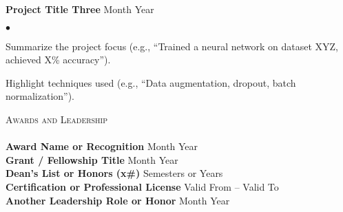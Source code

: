 \documentclass[10.5pt]{article}
\newcommand{\lineunder}{\vspace*{-8pt} \\ \hspace*{-18pt} \hrulefill \\}
\newcommand{\header}[1]{{\hspace*{-15pt}\vspace*{6pt} \textsc{#1}} \vspace*{-6pt} \lineunder}
\newcommand{\award}[2]{{\textbf{#1} \hfill #2}}
\newcommand{\project}[2]{{\textbf{#1} \hfill #2}}
\newenvironment{achievements}
  {\begin{list}{$\bullet$}{\topsep 0pt \itemsep -2pt}}  
  {\end{list}}
\begin{document}
\project{Project Title Three}{Month Year}
\begin{achievements}
    \item Summarize the project focus (e.g., “Trained a neural network on dataset XYZ, achieved X\% accuracy”).
    \item Highlight techniques used (e.g., “Data augmentation, dropout, batch normalization”).
\end{achievements}

\header{Awards and Leadership}
\award{Award Name or Recognition}{Month Year} \\
\award{Grant / Fellowship Title}{Month Year} \\
\award{Dean’s List or Honors (x\#)}{Semesters or Years} \\
\award{Certification or Professional License}{Valid From – Valid To} \\
\award{Another Leadership Role or Honor}{Month Year}
\end{document}
